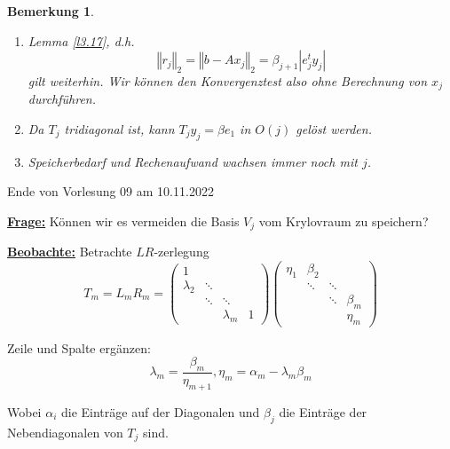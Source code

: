 \documentclass{book}
\newtheorem{remark}[algorithm]{Bemerkung}
\begin{document}
            \begin{remark}\label{b3.25}
                \begin{enumerate}
                    \item Lemma \ref{l3.17}, d.h. 
                    \[\left\Vert r_j \right\Vert_2=\left\Vert b-Ax_j \right\Vert_2=\beta_{j+1}\left\vert e_j^ty_j \right\vert\]
                    gilt weiterhin. Wir können den Konvergenztest also ohne Berechnung von $x_j$ durchführen.
                    \item Da $T_j$ tridiagonal ist, kann $T_jy_j=\beta e_1$ in $O(j)$ gelöst werden.
                    \item Speicherbedarf und Rechenaufwand wachsen immer noch mit $j$. 
                \end{enumerate}
            \end{remark}

            \noindent
            \xrfill[0.7ex]{1pt}Ende von Vorlesung 09 am 10.11.2022\xrfill[0.7ex]{1pt}
            
            \underline{\textbf{Frage:}}  Können wir es vermeiden die Basis $V_j$ vom Krylovraum 
            zu speichern?

            \underline{\textbf{Beobachte:}} Betrachte $LR$-zerlegung
            \begin{equation*}
                T_m=L_mR_m = \begin{pmatrix}
                    1 & & &\\
                    \lambda_2 & \ddots & & \\
                    & \ddots & \ddots &\\
                    && \lambda_m & 1
                \end{pmatrix}
                \begin{pmatrix}
                    \eta_1 & \beta_2& &\\
                     & \ddots & \ddots& \\
                    && \ddots & \beta_m \\
                    &&  & \eta_m
                \end{pmatrix}
            \end{equation*}

            Zeile und Spalte ergänzen:
            \[\lambda_m=\frac{\beta_m}{\eta_{m+1}}, \eta_m = \alpha_m -\lambda_m\beta_m\]

            Wobei $\alpha_i$ die Einträge auf der Diagonalen und $\beta_j$ die Einträge der Nebendiagonalen von $T_j$ sind.
\end{document}
